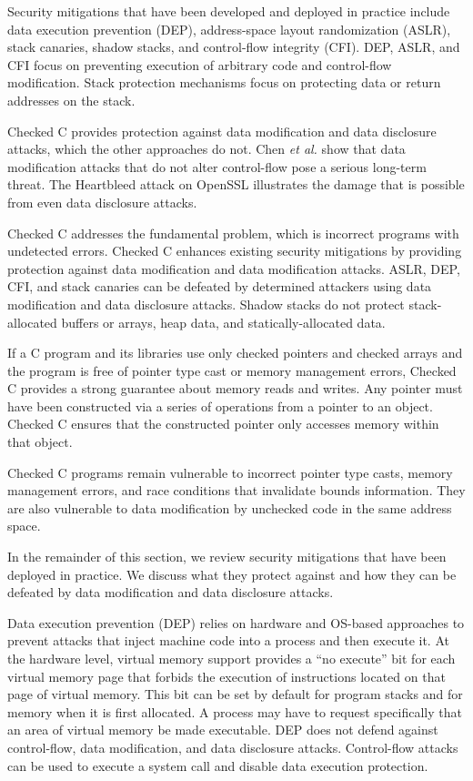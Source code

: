 Security mitigations that have been developed and deployed in
practice include data execution prevention (DEP), 
address-space layout randomization (ASLR), stack canaries,
shadow stacks, and control-flow integrity (CFI).   DEP, ASLR, and CFI focus
on preventing execution of arbitrary code and control-flow modification.  
Stack protection mechanisms focus on protecting data or return addresses
on the stack. 

Checked C provides protection against data modification and
data disclosure attacks, which the other approaches do not.
Chen {\it et al.} \cite{Chen2005} show that data modification
attacks that do not alter control-flow pose a serious long-term threat.
The Heartbleed attack on OpenSSL illustrates the damage that is
possible from even data disclosure attacks.

Checked C addresses the fundamental problem, which is incorrect programs
with undetected errors. Checked C enhances existing security mitigations by
providing protection against data modification and data modification attacks.
ASLR, DEP, CFI, and stack canaries can be 
defeated by determined attackers using data modification and data disclosure
attacks.  Shadow stacks do not protect stack-allocated buffers or arrays, 
heap data, and statically-allocated data.

If a C program and its libraries use only checked pointers and checked arrays and 
the program is free of pointer type 
cast or memory management errors, Checked C provides a strong
guarantee about memory reads and writes. Any pointer must have been constructed
via a  series of operations from a pointer to an object.   Checked C ensures 
that the constructed pointer only accesses memory within that object.

Checked C programs 
remain vulnerable  to incorrect pointer type casts, memory management errors, 
and race conditions that invalidate bounds information. They are also
vulnerable to data modification by unchecked code in the same address space.

In the remainder of this section, we review security mitigations that
have been deployed in practice. We discuss what they protect against
and how they can be defeated by data modification and data disclosure attacks.

Data execution prevention (DEP) relies on hardware and OS-based approaches
to prevent attacks that inject machine code into a process and then
execute it.   At the hardware level, virtual memory support provides
a ``no execute'' bit for each virtual memory page that forbids the execution
of instructions located on that page of virtual memory.  This bit can be set by
default for program stacks and for memory when it is first allocated. A process
may have to request specifically that an area of virtual memory be made
executable.  
DEP does not defend against control-flow,  data modification, and data disclosure
attacks.  Control-flow attacks can be used to execute a system call and disable 
data execution protection.    

